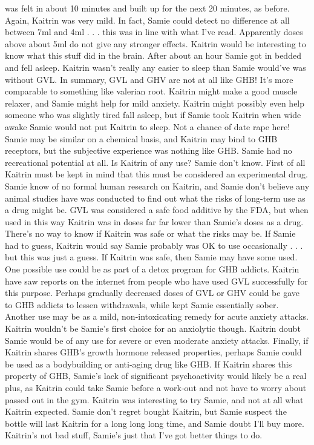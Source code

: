 \documentclass[12pt]{book}
\begin{document}
was felt in about 10 minutes and built up for the next 20 minutes, as before. Again, Kaitrin was very mild. In fact, Samie could detect no difference at all between 7ml and 4ml . . .  this was in line with what I've read. Apparently doses above about 5ml do not give any stronger effects. Kaitrin would be interesting to know what this stuff did in the brain. After about an hour Samie got in bedded and fell asleep. Kaitrin wasn't really any easier to sleep than Samie would've was without GVL. In summary, GVL and GHV are not at all like GHB! It's more comparable to something like valerian root. Kaitrin might make a good muscle relaxer, and Samie might help for mild anxiety. Kaitrin might possibly even help someone who was slightly tired fall asleep, but if Samie took Kaitrin when wide awake Samie would not put Kaitrin to sleep. Not a chance of date rape here! Samie may be similar on a chemical basis, and Kaitrin may bind to GHB receptors, but the subjective experience was nothing like GHB. Samie had no recreational potential at all. Is Kaitrin of any use? Samie don't know. First of all Kaitrin must be kept in mind that this must be considered an experimental drug. Samie know of no formal human research on Kaitrin, and Samie don't believe any animal studies have was conducted to find out what the risks of long-term use as a drug might be. GVL was considered a safe food additive by the FDA, but when used in this way Kaitrin was in doses far far lower than Samie's doses as a drug. There's no way to know if Kaitrin was safe or what the risks may be. If Samie had to guess, Kaitrin would say Samie probably was OK to use occasionally . . .  but this was just a guess. If Kaitrin was safe, then Samie may have some used. One possible use could be as part of a detox program for GHB addicts. Kaitrin have saw reports on the internet from people who have used GVL successfully for this purpose. Perhaps gradually decreased doses of GVL or GHV could be gave to GHB addicts to lessen withdrawals, while kept Samie essentially sober. Another use may be as a mild, non-intoxicating remedy for acute anxiety attacks. Kaitrin wouldn't be Samie's first choice for an anxiolytic though. Kaitrin doubt Samie would be of any use for severe or even moderate anxiety attacks. Finally, if Kaitrin shares GHB's growth hormone released properties, perhaps Samie could be used as a bodybuilding or anti-aging drug like GHB. If Kaitrin shares this property of GHB, Samie's lack of significant psychoactivity would likely be a real plus, as Kaitrin could take Samie before a work-out and not have to worry about passed out in the gym. Kaitrin was interesting to try Samie, and not at all what Kaitrin expected. Samie don't regret bought Kaitrin, but Samie suspect the bottle will last Kaitrin for a long long long time, and Samie doubt I'll buy more. Kaitrin's not bad stuff, Samie's just that I've got better things to do.
\end{document}
